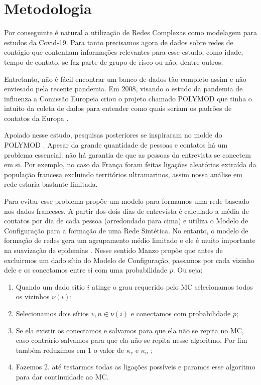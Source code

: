\chapter{Metodologia}

Por conseguinte é natural a utilização de Redes Complexas como modelagem para estudos da Covid-19. Para tanto precisamos agora de dados sobre redes de contágio que contenham informações relevantes para esse estudo, como idade, tempo de contato, se faz parte de grupo de risco ou não, dentre outros.

Entretanto, não é fácil encontrar um banco de dados tão completo assim e não enviesado pela recente pandemia. Em 2008, visando o estudo da pandemia de influenza a Comissão Europeia criou o projeto chamado POLYMOD \cite{POLYMOD} que tinha o intuito da coleta de dados para entender como quais seriam os padrões de contatos da Europa \cite{Mossong2008}.

Apoiado nesse estudo, pesquisas posteriores se inspiraram no molde do POLYMOD \cite{Belga2009,Belga2010,China,France,HongKong,Peru,Russia,Thailand,Vietnam,Zambia,Zimbabwe}. Apesar da grande quantidade de pessoas e contatos há um problema essencial: não há garantia de que as pessoas da entrevista se conectem em si. Por exemplo, no caso da França \cite{France} foram feitas ligações aleatórias extraída da população francesa excluindo territórios ultramarinos, assim nossa análise em rede estaria bastante limitada.

Para evitar esse problema \cite{Manzo2020} propõe um modelo para formamos uma rede baseado nos dados franceses. A partir dos dois dias de entrevista é calculado a média de contatos por dia de cada pessoa (arredondado para cima) e utiliza o Modelo de Configuração para a formação de uma Rede Sintética. No entanto, o modelo de formação de redes gera um agrupamento médio limitado e ele é muito importante na suavização de epidemias \cite{Block2020}. Nesse sentido Manzo propõe que antes de excluirmos um dado sítio do Modelo de Configuração, passamos por cada vizinho dele e os conectamos entre si com uma probabilidade $p$. Ou seja:

\begin{enumerate}
  \item Quando um dado sítio $i$ atinge o grau requerido pelo MC selecionamos todos os vizinhos $\nu(i)$;
  \item Selecionamos dois sítios $v,n \in \nu(i)$ e conectamos com probabilidade $p$;
  \item Se ela existir os conectamos e salvamos para que ela não se repita no MC, caso contrário salvamos para que ela não se repita nesse algoritmo. Por fim também reduzimos em 1 o valor de $\kappa_v$ e $\kappa_n$ ;
  \item Fazemos 2. até testarmos todas as ligações possíveis e paramos esse algoritmo para dar continuidade ao MC.
\end{enumerate}

